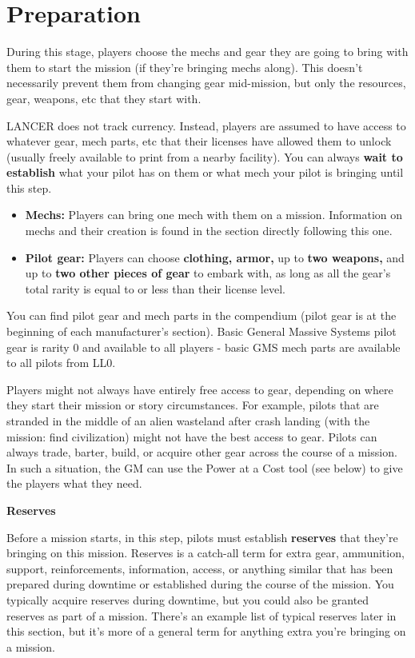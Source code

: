 \section{Preparation}

During this stage, players choose the mechs and gear they are going to bring with them to start the mission (if they’re bringing mechs along). This doesn’t necessarily prevent them from changing gear mid-mission, but only the resources, gear, weapons, etc that they start with.

LANCER does not track currency. Instead, players are assumed to have access to whatever gear, mech parts, etc that their licenses have allowed them to unlock (usually freely available to print from a nearby facility). You can always \textbf{wait to establish} what your pilot has on them or what mech your pilot is bringing until this step.

\begin{itemize}
\item \textbf{Mechs:} Players can bring one mech with them on a mission. Information on mechs and their creation is found in the section directly following this one.
\item \textbf{Pilot gear:} Players can choose \textbf{clothing, armor,} up to \textbf{two weapons,} and up to \textbf{two other pieces of gear} to embark with, as long as all the gear’s total rarity is equal to or less than their license level.
\end{itemize}  
You can find pilot gear and mech parts in the compendium (pilot gear is at the beginning of each manufacturer’s section). Basic General Massive Systems pilot gear is rarity 0 and available to all players - basic GMS mech parts are available to all pilots from LL0.

Players might not always have entirely free access to gear, depending on where they start their mission or story circumstances. For example, pilots that are stranded in the middle of an alien wasteland after crash landing (with the mission: find civilization) might not have the best access to gear. Pilots can always trade, barter, build, or acquire other gear across the course of a mission. In such a situation, the GM can use the Power at a Cost tool (see below) to give the
players what they need.

\begin{center}
\textbf{Reserves}
\end{center}

Before a mission starts, in this step, pilots must establish \textbf{reserves} that they’re bringing on this mission. Reserves is a catch-all term for extra gear, ammunition, support, reinforcements, information, access, or anything similar that has been prepared during downtime or established during the course of the mission. You typically acquire reserves during downtime, but you could also be granted reserves as part of a mission. There’s an example list of typical reserves later in this section, but it’s more of a general term for anything extra you’re bringing on a mission.
